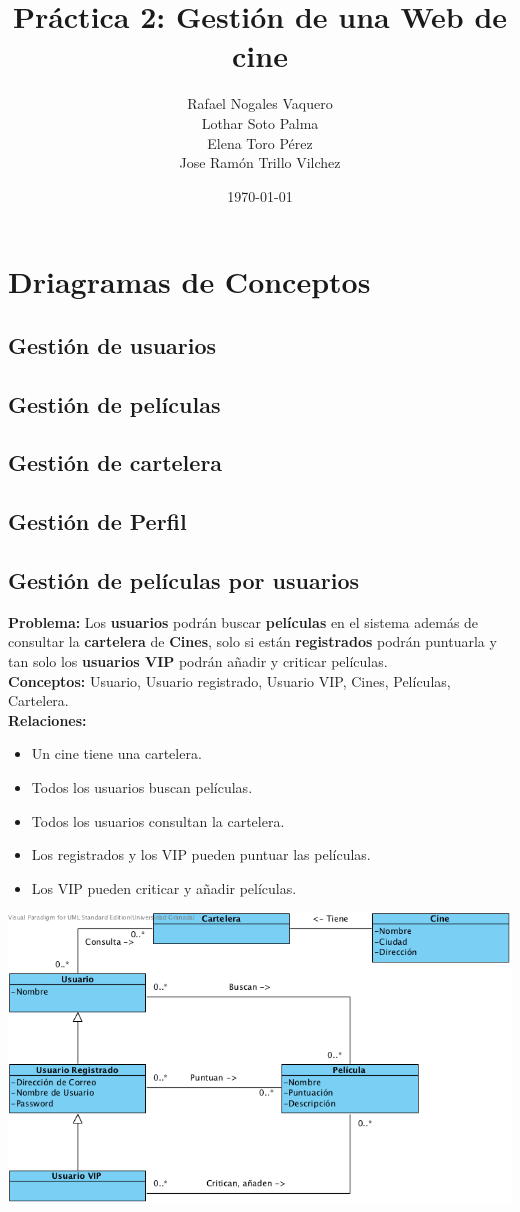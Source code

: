 \documentclass{article}
\title{Práctica 2: Gestión de una Web de cine}
\author{Rafael Nogales Vaquero
\\Lothar Soto Palma
\\Elena Toro Pérez
\\Jose Ramón Trillo Vilchez}
\date{\today}
\begin{document}
\maketitle
\section{Driagramas de Conceptos}
	\subsection*{Gestión de usuarios}
	\subsection*{Gestión de películas}
	\subsection*{Gestión de cartelera}
	\subsection*{Gestión de Perfil}
	\subsection*{Gestión de películas por usuarios}
	\textbf{Problema:} Los \textbf{usuarios} podrán buscar \textbf{películas} en el sistema además de consultar la \textbf{cartelera} de \textbf{Cines}, solo si están \textbf{registrados} podrán puntuarla y tan solo los \textbf{usuarios VIP} podrán añadir y criticar películas.\\
	\textbf{Conceptos:} Usuario, Usuario registrado, Usuario VIP, Cines, Películas, Cartelera.\\
\textbf{	Relaciones:}
		\begin{itemize}
			\item Un cine tiene una cartelera.
			\item Todos los usuarios buscan películas.
			\item Todos los usuarios consultan la cartelera.
			\item Los registrados y los VIP pueden puntuar las películas.
			\item Los VIP pueden criticar y añadir películas.		
		\end{itemize}
			\includegraphics[width=1\linewidth]{./C-PeliculasUsuarios}
\end{document}
